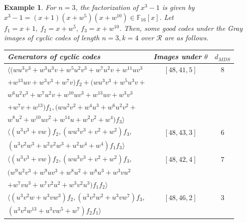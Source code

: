 \documentclass{amsart}
\newtheorem{example}[theorem]{Example}
\theoremstyle{definition}
\theoremstyle{remark}
\numberwithin{equation}{section}
\begin{document}
\begin{example}
		For $n=3$, the factorization of $x^3-1$ is given by $x^3-1=(x+1)(x+w^5)(x+w^{10})\in \mathbb F_{16}[x]$. Let $f_1=x+1,~f_2=x+w^5,~f_3=x+w^{10}$. Then, some good codes under the Gray images of cyclic codes of length $n = 3, k = 4$ over $\mathcal{R}$ are as follows.
   
    \allowdisplaybreaks
    {\renewcommand{\arraystretch}{1.2}\begin{longtable}{ | l | c | c | }
					\hline
			    	Generators of cyclic codes & Images under $\theta$
                      & $d_{MDS}$ \\
					\hline	
                	$\langle(wu^3v^3 + w^3u^3v + w^5u^2v^3 + w^7u^2v + w^{11}uv^3$  &  $[48,41,5]$
                      & $8$ \\
                   $+ w^{13}uv + w^3v^3 + w^7v )f_2 + (wu^3v^3 + w^5u^3v +$  & &  \\
                    $w^6u^2v^3 + w^7u^2v + w^{10}uv^3 + w^{13}uv + w^3v^3 $ & &  \\
                      $+ w^7v + w^{13})f_1, (wu^2v^2 + w^4u^3 + w^6u^2v^2 +$       & &  \\
                     $ w^8u^2 + w^{10}uv^2 + w^{14}u + w^2v^2 + w^4 )f_3\rangle$ & &  \\
					$\langle (u^3v^3+vw)f_2,(w u^3v^3+v^2+w^2)f_3,$  &  $[48,43,3]$
                      & $6$ \\
                       $(u^3v^2w^3+u^2v^2w^3+u^2w^4+w^4)f_1f_3\rangle$ & &  \\
					$\langle (u^3v^3+vw)f_2,(w u^3v^3+v^2+w^2)f_3,$
                      &  $[48,42,4]$& $7$  \\
                        $  (w^9u^2v^3 +w^9uv^3+w^8u^2+w^8u^3+w^3vu^2 $    & &  \\
                       $+w^7vu^3+w^7v^2u^2+w^3v^2u^3)f_1f_2\rangle$ & &  \\ 
					$\langle (u^3v^2w+u^3vw^3)f_2,(u^3v^2w^2+u^3vw^7)f_3,$ &
                        $[48,46,2]$
                      & $3$ \\
                       $(u^3v^2w^{13}+u^3vw^5+w^7)f_2f_1\rangle$ & &  \\
				   \hline
		\end{longtable}}
\end{example}
\end{document}
